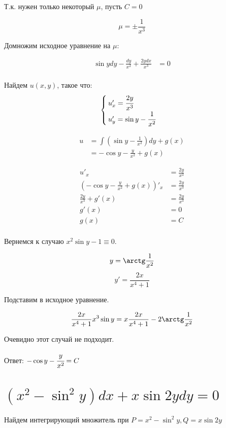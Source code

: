 Т.к. нужен только некоторый $\mu$, пусть $C=0$

\[\mu = \pm\frac{1}{x^3}\]

Домножим исходное уравнение на $\mu$:

\begin{align*}
    \sin y dy - \frac{dy}{x^2} + \frac{2ydx}{x^3} & = 0 \\
\end{align*}

Найдем $u(x, y)$, такое что:
\[\begin{cases}
        u'_x = \cfrac{2y}{x^3} \\
        u'_y = \sin y - \cfrac{1}{x^2}
    \end{cases}\]

\begin{align*}
    u & = \int \left(\sin y - \frac{1}{x^2}\right)dy + g(x) \\
      & = -\cos y - \frac{y}{x^2} + g(x)
\end{align*}

\begin{align*}
    u'_x                                           & = \frac{2y}{x^3} \\
    \left(-\cos y - \frac{y}{x^2} + g(x)\right)'_x & = \frac{2y}{x^3} \\
    \frac{2y}{x^3} + g'(x)                         & = \frac{2y}{x^3} \\
    g'(x)                                          & = 0              \\
    g(x)                                           & = C              \\
\end{align*}

Вернемся к случаю $x^2\sin y - 1 \equiv 0$.

\[y = \arctg\frac{1}{x^2}\]
\[y' = \frac{2x}{x^4+1}\]

Подставим в исходное уравнение.

\[\frac{2x}{x^4+1}x^3 \sin y = x\frac{2x}{x^4+1} - 2\arctg\frac{1}{x^2}\]

Очевидно этот случай не подходит.

Ответ: \(-\cos y - \cfrac{y}{x^2} = C\)

\section{\((x^2 - \sin^2 y) dx + x\sin 2y dy = 0\)}

Найдем интегрирующий множитель при $P = x^2 - \sin^2 y, Q = x\sin 2y$

